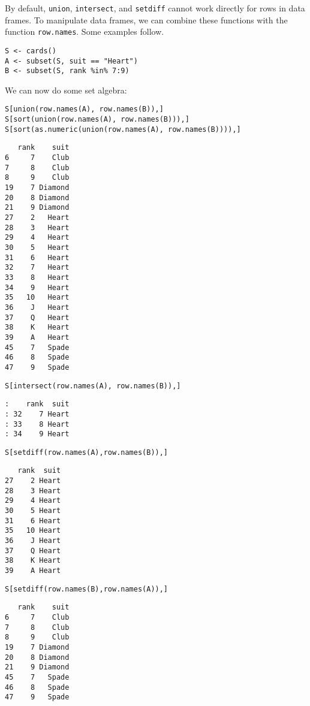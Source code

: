 By default, \texttt{union}, \texttt{intersect}, and \texttt{setdiff} cannot work directly for rows in data frames.
To manipulate data frames, we can combine these functions with the function \texttt{row.names}.
Some examples follow. 

\begin{Verbatim}
S <- cards() 
A <- subset(S, suit == "Heart") 
B <- subset(S, rank %in% 7:9)
\end{Verbatim}

We can now do some set algebra: 

\begin{Verbatim}
S[union(row.names(A), row.names(B)),]
S[sort(union(row.names(A), row.names(B))),]
S[sort(as.numeric(union(row.names(A), row.names(B)))),]
\end{Verbatim}

\begin{verbatim}
   rank    suit
6     7    Club
7     8    Club
8     9    Club
19    7 Diamond
20    8 Diamond
21    9 Diamond
27    2   Heart
28    3   Heart
29    4   Heart
30    5   Heart
31    6   Heart
32    7   Heart
33    8   Heart
34    9   Heart
35   10   Heart
36    J   Heart
37    Q   Heart
38    K   Heart
39    A   Heart
45    7   Spade
46    8   Spade
47    9   Spade
\end{verbatim}

\begin{Verbatim}
S[intersect(row.names(A), row.names(B)),]
\end{Verbatim}

\begin{verbatim}
:    rank  suit
: 32    7 Heart
: 33    8 Heart
: 34    9 Heart
\end{verbatim}

\begin{Verbatim}
S[setdiff(row.names(A),row.names(B)),]
\end{Verbatim}

\begin{verbatim}
   rank  suit
27    2 Heart
28    3 Heart
29    4 Heart
30    5 Heart
31    6 Heart
35   10 Heart
36    J Heart
37    Q Heart
38    K Heart
39    A Heart
\end{verbatim}

\begin{Verbatim}
S[setdiff(row.names(B),row.names(A)),]
\end{Verbatim}

\begin{verbatim}
   rank    suit
6     7    Club
7     8    Club
8     9    Club
19    7 Diamond
20    8 Diamond
21    9 Diamond
45    7   Spade
46    8   Spade
47    9   Spade
\end{verbatim}

